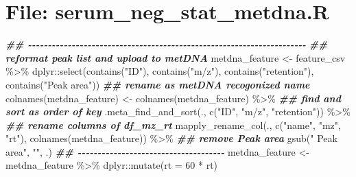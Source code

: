 \documentclass[
]{article}
\newenvironment{Shaded}{\begin{snugshade}}{\end{snugshade}}
\newcommand{\AttributeTok}[1]{\textcolor[rgb]{0.77,0.63,0.00}{#1}}
\newcommand{\DecValTok}[1]{\textcolor[rgb]{0.00,0.00,0.81}{#1}}
\newcommand{\DocumentationTok}[1]{\textcolor[rgb]{0.56,0.35,0.01}{\textbf{\textit{#1}}}}
\newcommand{\FunctionTok}[1]{\textcolor[rgb]{0.00,0.00,0.00}{#1}}
\newcommand{\NormalTok}[1]{#1}
\newcommand{\OtherTok}[1]{\textcolor[rgb]{0.56,0.35,0.01}{#1}}
\newcommand{\SpecialCharTok}[1]{\textcolor[rgb]{0.00,0.00,0.00}{#1}}
\newcommand{\StringTok}[1]{\textcolor[rgb]{0.31,0.60,0.02}{#1}}
\begin{document}
\hypertarget{file-serum_neg_stat_metdna.r}{%
\section{File: serum\_neg\_stat\_metdna.R}\label{file-serum_neg_stat_metdna.r}}

\begin{Shaded}
\begin{Highlighting}[]
\DocumentationTok{\#\# {-}{-}{-}{-}{-}{-}{-}{-}{-}{-}{-}{-}{-}{-}{-}{-}{-}{-}{-}{-}{-}{-}{-}{-}{-}{-}{-}{-}{-}{-}{-}{-}{-}{-}{-}{-}{-}{-}{-}{-}{-}{-}{-}{-}{-}{-}{-}{-}{-}{-}{-}{-}{-}{-}{-}{-}{-}{-}{-}{-}{-}{-}{-}{-}{-}{-}{-}{-}{-}{-} }
\DocumentationTok{\#\# reformat peak list and upload to metDNA}
\NormalTok{metdna\_feature }\OtherTok{\textless{}{-}}\NormalTok{ feature\_csv }\SpecialCharTok{\%\textgreater{}\%}
\NormalTok{  dplyr}\SpecialCharTok{::}\FunctionTok{select}\NormalTok{(}\FunctionTok{contains}\NormalTok{(}\StringTok{"ID"}\NormalTok{), }\FunctionTok{contains}\NormalTok{(}\StringTok{"m/z"}\NormalTok{), }\FunctionTok{contains}\NormalTok{(}\StringTok{"retention"}\NormalTok{), }\FunctionTok{contains}\NormalTok{(}\StringTok{"Peak area"}\NormalTok{))}
\DocumentationTok{\#\# rename as metDNA recogonized name}
\FunctionTok{colnames}\NormalTok{(metdna\_feature) }\OtherTok{\textless{}{-}} \FunctionTok{colnames}\NormalTok{(metdna\_feature) }\SpecialCharTok{\%\textgreater{}\%} 
  \DocumentationTok{\#\# find and sort as order of \textasciigrave{}key\textasciigrave{}}
  \FunctionTok{.meta\_find\_and\_sort}\NormalTok{(., }\FunctionTok{c}\NormalTok{(}\StringTok{"ID"}\NormalTok{, }\StringTok{"m/z"}\NormalTok{, }\StringTok{"retention"}\NormalTok{)) }\SpecialCharTok{\%\textgreater{}\%} 
  \DocumentationTok{\#\# rename columns of df\_mz\_rt}
  \FunctionTok{mapply\_rename\_col}\NormalTok{(., }\FunctionTok{c}\NormalTok{(}\StringTok{"name"}\NormalTok{, }\StringTok{"mz"}\NormalTok{, }\StringTok{"rt"}\NormalTok{), }\FunctionTok{colnames}\NormalTok{(metdna\_feature)) }\SpecialCharTok{\%\textgreater{}\%} 
  \DocumentationTok{\#\# remove \textasciigrave{} Peak area\textasciigrave{}}
  \FunctionTok{gsub}\NormalTok{(}\StringTok{" Peak area"}\NormalTok{, }\StringTok{""}\NormalTok{, .)}
\DocumentationTok{\#\# {-}{-}{-}{-}{-}{-}{-}{-}{-}{-}{-}{-}{-}{-}{-}{-}{-}{-}{-}{-}{-}{-}{-}{-}{-}{-}{-}{-}{-}{-}{-}{-}{-}{-}{-}{-}{-} }
\NormalTok{metdna\_feature }\OtherTok{\textless{}{-}}\NormalTok{ metdna\_feature }\SpecialCharTok{\%\textgreater{}\%} 
\NormalTok{  dplyr}\SpecialCharTok{::}\FunctionTok{mutate}\NormalTok{(}\AttributeTok{rt =} \DecValTok{60} \SpecialCharTok{*}\NormalTok{ rt)}

\end{Highlighting}
\end{Shaded}
\end{document}
